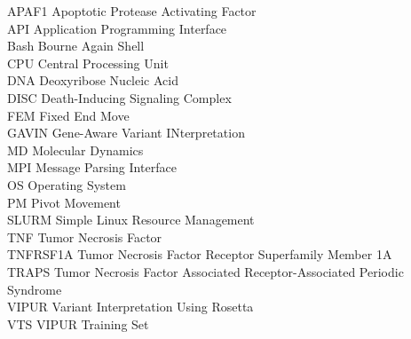 APAF1 Apoptotic Protease Activating Factor\\
API Application Programming Interface\\
Bash Bourne Again Shell\\
CPU Central Processing Unit\\
DNA Deoxyribose Nucleic Acid\\
DISC Death-Inducing Signaling Complex\\
FEM Fixed End Move\\
GAVIN Gene-Aware Variant INterpretation\\
MD	Molecular Dynamics\\
MPI Message Parsing Interface\\
OS Operating System\\
PM Pivot Movement\\
SLURM Simple Linux Resource Management\\
TNF Tumor Necrosis Factor\\
TNFRSF1A Tumor Necrosis Factor Receptor Superfamily Member 1A\\
TRAPS Tumor Necrosis Factor Associated Receptor-Associated Periodic Syndrome\\
VIPUR Variant Interpretation Using Rosetta\\
VTS VIPUR Training Set\\